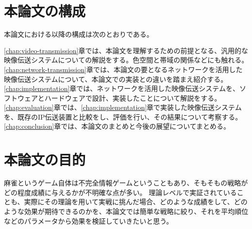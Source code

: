 \section{本論文の構成}
本論文における以降の構成は次のとおりである。

\ref{chap:video-transmission}章では、本論文を理解するための前提となる、汎用的な映像伝送システムについての解説をする。色空間と帯域の関係などにも触れる。
\ref{chap:network-transmission}章では、本論文の要となるネットワークを活用した映像伝送システムについて、本論文での実装との違いを踏まえ紹介する。
\ref{chap:implementation}章では、ネットワークを活用した映像伝送システムを、ソフトウェアとハードウェアで設計、実装したことについて解説をする。
\ref{chap:evaluation}章では、\ref{chap:implementation}章で実装した映像伝送システムを、既存のIP伝送装置と比較をし、評価を行い、その結果について考察する。
\ref{chap:conclusion}章では、本論文のまとめと今後の展望についてまとめる。

\section{本論文の目的}
麻雀というゲーム自体は不完全情報ゲームということもあり、そもそもの戦略がどの程度成績に与えるかが不明確な点が多い。
理論レベルで実証されていることも、実際にその理論を用いて実戦に挑んだ場合、どのような成績をして、どのような効果が期待できるのかを、本論文では簡単な戦略に絞り、それを平均順位などのパラメータから効果を検証していきたいと思う。
